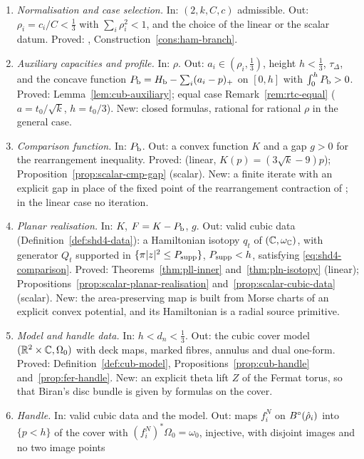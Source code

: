 \begin{enumerate}[label=\textbf{F\arabic*},leftmargin=*,itemsep=3pt]
\item \emph{Normalisation and case selection.} In: $(2,k,C,c)$ admissible. Out: $\rho_i=c_i/C<\frac13$ with
 $\sum_i\rho_i^2<1$, and the choice of the linear or the scalar datum. Proved: ,
 Construction~\ref{cons:ham-branch}.
\item \emph{Auxiliary capacities and profile.} In: $\rho$. Out: $a_i\in(\rho_i,\frac13)$, height $h<\frac13$,
 $\tau_\Delta$, and the concave function $P_{\mathrm b}=H_{\mathrm b}-\sum_i(a_i-p)_+$ on $[0,h]$ with $\int_0^hP_{\mathrm b}>0$. Proved:
 Lemma~\ref{lem:cub-auxiliary}; equal case Remark~\ref{rem:rtc-equal} ($a=t_0/\sqrt k$, $h=t_0/3$). New: closed
 formulas, rational for rational $\rho$ in the general case.
\item \emph{Comparison function.} In: $P_{\mathrm b}$. Out: a convex function $K$ and a gap $g>0$ for the rearrangement
 inequality. Proved:  (linear, $K(p)=(3\sqrt k-9)p$); Proposition~\ref{prop:scalar-cmp-gap}
 (scalar). New: a finite iterate with an explicit gap in place of the fixed point of the rearrangement contraction of
 \cite{OpenAI2026}; in the linear case no iteration.
\item \emph{Planar realisation.} In: $K$, $F=K-P_{\mathrm b}$, $g$. Out: valid cubic data (Definition~\ref{def:shd4-data}): a
 Hamiltonian isotopy $q_t$ of $(\mathbb{C},\omega_{\mathbb{C}})$, with generator $Q_t$ supported in $\{\pi|z|^2\le P_{\rm supp}\}$,
 $P_{\rm supp}<h$, satisfying \eqref{eq:shd4-comparison}. Proved: Theorems~\ref{thm:pll-inner} and~\ref{thm:pln-isotopy}
 (linear); Propositions~\ref{prop:scalar-planar-realisation} and~\ref{prop:scalar-cubic-data} (scalar). New: the
 area-preserving map is built from Morse charts of an explicit convex potential, and its Hamiltonian is a radial source
 primitive.
\item \emph{Model and handle data.} In: $h<d_n<\frac13$. Out: the cubic cover model $(\mathbb{R}^2\times\mathbb{C},\Omega_0)$ with
 deck maps, marked fibres, annulus and dual one-form. Proved: Definition~\ref{def:cub-model},
 Propositions~\ref{prop:cub-handle} and~\ref{prop:fer-handle}. New: an explicit theta lift $Z$ of the Fermat torus, so that
 Biran's disc bundle \cite{Biran2001} is given by formulas on the cover.
\item \emph{Handle.} In: valid cubic data and the model. Out: maps $f^N_i$ on $B^{\circ}(\hat\rho_i)$ into
 $\{p<h\}$ of the cover with $(f^N_i)^*\Omega_0=\omega_0$, injective, with disjoint images and no two image points

\end{enumerate}
